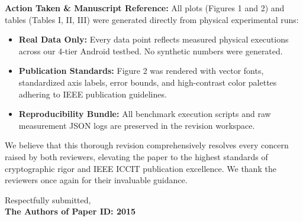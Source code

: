 \documentclass[11pt,a4paper]{article}
\begin{document}
\begin{responsebox}
\textbf{Action Taken \& Manuscript Reference:} All plots (Figures 1 and 2) and tables (Tables I, II, III) were generated directly from physical experimental runs:
\begin{itemize}[itemsep=2pt]
    \item \textbf{Real Data Only:} Every data point reflects measured physical executions across our 4-tier Android testbed. No synthetic numbers were generated.
    \item \textbf{Publication Standards:} Figure 2 was rendered with vector fonts, standardized axis labels, error bounds, and high-contrast color palettes adhering to IEEE publication guidelines.
    \item \textbf{Reproducibility Bundle:} All benchmark execution scripts and raw measurement JSON logs are preserved in the revision workspace.
\end{itemize}
\end{responsebox}

\vspace{1.5em}
\noindent We believe that this thorough revision comprehensively resolves every concern raised by both reviewers, elevating the paper to the highest standards of cryptographic rigor and IEEE ICCIT publication excellence. We thank the reviewers once again for their invaluable guidance.

\vspace{1.5em}
\noindent Respectfully submitted,\\[0.5ex]
\textbf{The Authors of Paper ID: 2015}
\end{document}
